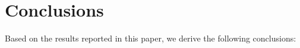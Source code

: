 \documentclass[journal,article,submit,pdftex,moreauthors]{Definitions/mdpi}
\begin{document}


\section{Conclusions}
Based on the results reported in this paper, we derive the following conclusions:
\end{document}
